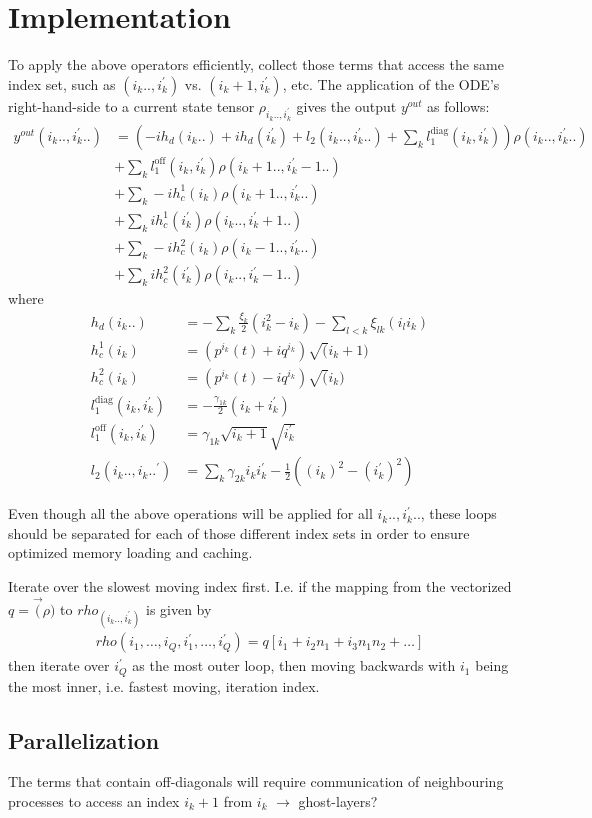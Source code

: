 \documentclass[letterpaper]{article}
\begin{document}
\section{Implementation}

  To apply the above operators efficiently, collect those terms that access the same index set, such as $(i_k..,i_k^\prime)$ vs. $(i_k+1, i_k^\prime)$, etc. The application of the ODE's right-hand-side to a current state tensor $\rho_{i_k..,i_k^\prime}$ gives the output $y^{out}$ as follows:
  \begin{align}
       y^{out}(i_k..,i_k^\prime..)  &= 
       \left(-i h_d(i_k..) + ih_d(i_k^\prime)
        + l_2(i_k..,i_k^\prime..) + \sum_k l_1^{\text{diag}}(i_k, i_k^\prime) \right) \rho(i_k..,i_k^\prime..) \\
        &+ \sum_k l_1^{\text{off}}(i_k, i_k^\prime) \rho(i_k+1.., i_k^\prime -1..)\\
        &+ \sum_k -i h_c^1(i_k) \rho(i_k+1.., i_k^\prime..) \\
        &+ \sum_k ih_c^1(i_k^\prime) \rho(i_k..,i_k^\prime +1 ..) \\
        &+ \sum_k -i h_c^2(i_k) \rho(i_k-1.., i_k^\prime..) \\
        &+ \sum_k ih_c^2(i_k^\prime) \rho(i_k..,i_k^\prime -1 ..) 
  \end{align}
  where 
  \begin{align}
    h_d(i_k..) &= -\sum_k \frac{\xi_k}{2}(i_k^2 - i_k) - \sum_{l<k} \xi_{lk} (i_l i_k) \\
    h_c^1(i_k) &= \left(p^{i_k}(t) + iq^{i_k}\right)\sqrt(i_k+1) \\
    h_c^2(i_k) &= \left(p^{i_k}(t) - iq^{i_k}\right)\sqrt(i_k) \\
    l_1^{\text{diag}}(i_k, i_k^\prime) &= -\frac{\gamma_{1k}}{2}\left(i_k + i_k^\prime\right) \\
    l_1^{\text{off}}(i_k,i_k^\prime) &= \gamma_{1k} \sqrt{i_k+1}\sqrt{i_k^\prime} \\
    l_2(i_k..,i_k..^\prime) &= \sum_k \gamma_{2k} i_ki_k^\prime - \frac 12 \left( (i_k)^2 - (i_k^\prime)^2\right)
  \end{align}
  
  Even though all the above operations will be applied for all $i_k.., i_k^\prime..$, these loops should be separated for each of those different index sets in order to ensure optimized memory loading and caching.

  Iterate over the slowest moving index first. I.e. if the mapping from the vectorized $q = \vec(\rho)$ to $rho_(i_k..,i_k^\prime)$ is given by
    \begin{align}
        rho(i_1,\dots,i_Q,i_1^\prime,\dots,i_Q^\prime) = q[i_1 + i_2n_1 + i_3n_1n_2 + \dots]
    \end{align}
  then iterate over $i_Q^\prime$ as the most outer loop, then moving backwards with $i_1$ being the most inner, i.e. fastest moving, iteration index.

 \subsection{Parallelization} 
 The terms that contain off-diagonals will require communication of neighbouring processes to access an index $i_k+1$ from $i_k$ $\rightarrow$ ghost-layers?
\end{document}
